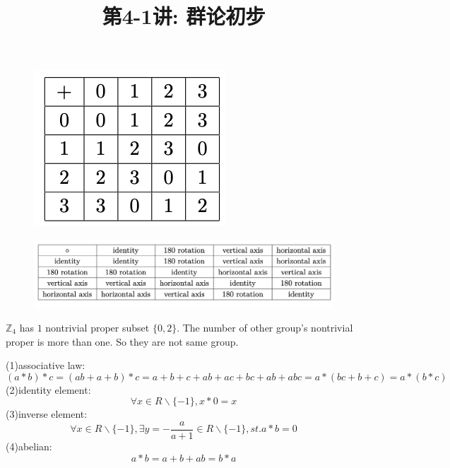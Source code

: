 \documentclass[a4paper, justified]{tufte-handout}
\title{第4-1讲: 群论初步}
\date{\zhtoday} %
\begin{document}
\maketitle
\noplagiarism %
\begin{abstract}
\end{abstract}
\beginrequired

\begin{problem}[TJ 3-3]
\end{problem}

\begin{solution}
 \begin{figure}[htbp]
    \centering
    \includegraphics[width = 0.30\linewidth]{figs/a}
  \end{figure}
   \begin{figure}[htbp]
    \centering
    \includegraphics[width = 0.90\linewidth]{figs/b}
  \end{figure}

\noindent $\mathbb{Z}_4$  has $1$ nontrivial proper subset $\{0,2\}$. The number of other group's nontrivial proper is more than one. So they are not same group.  
\end{solution}

\begin{problem}[TJ-3-7]
\end{problem}

\begin{solution}
(1)associative law:\\
\[
(a* b) * c = (ab+a+b)*c=a+b+c+ab+ac+bc+ab+abc=a*(bc+b+c)=a*(b*c)
\]
(2)identity element:\\
\[
\forall x\in R\backslash \{-1\},x*0=x
\]
(3)inverse element:\\
\[
\forall x\in R\backslash \{-1\},\exists y = -\frac{a}{a+1}\in R\backslash \{-1\},st. a*b=0
\]
(4)abelian:\\
\[
a*b=a+b+ab=b*a 
\]
\end{solution}
\end{document}

